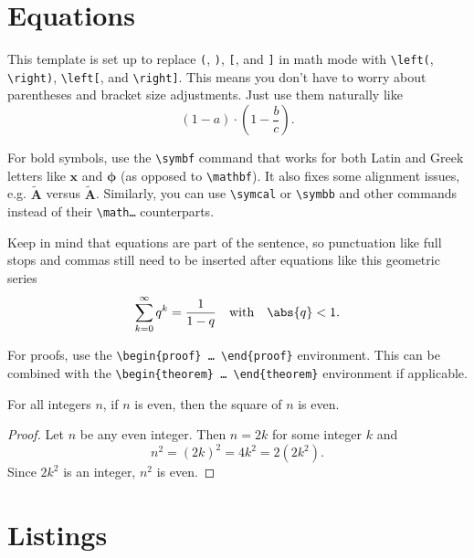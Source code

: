 \section{Equations}
\label{equations}

This template is set up to replace \texttt{(}, \texttt{)}, \texttt{[}, and \texttt{]} in math mode with \texttt{\textbackslash left(}, \texttt{\textbackslash right)}, \texttt{\textbackslash left[}, and \texttt{\textbackslash right]}. This means you don't have to worry about parentheses and bracket size adjustments. Just use them naturally like
\begin{equation}
  \label{eq:label}
  (1 - a) \cdot (1 - \frac{b}{c})
  \text{.}
\end{equation}

For bold symbols, use the \texttt{\textbackslash symbf} command that works for both Latin and Greek letters like $\symbf{x}$ and $\symbf{\phi}$ (as opposed to \texttt{\textbackslash mathbf}). It also fixes some alignment issues, e.g. $\tilde{\symbf{A}}$ versus $\tilde{\mathbf{A}}$. Similarly, you can use \texttt{\textbackslash symcal} or \texttt{\textbackslash symbb} and other commands instead of their \texttt{\textbackslash math\dots} counterparts.

Keep in mind that equations are part of the sentence, so punctuation like full stops and commas still need to be inserted after equations like this geometric series
\begin{equation}
  \label{eq:label2}
  \sum_{k=0}^\infty q^k = \frac{1}{1-q}
  \quad\text{with}\quad
  \abs{q} < 1
  \text{.}
\end{equation}

For proofs, use the \texttt{\textbackslash begin\{proof\} \dots\ \textbackslash end\{proof\}} environment. This can be combined with the \texttt{\textbackslash begin\{theorem\} \dots\ \textbackslash end\{theorem\}} environment if applicable.

\begin{theorem}
  For all integers $n$, if $n$ is even, then the square of $n$ is even.
\end{theorem}

\begin{proof}
  Let $n$ be any even integer. Then $n = 2k$ for some integer $k$ and
  $$n^2 = (2k)^2 = 4k^2 = 2(2k^2) \text{.}$$
  Since $2k^2$ is an integer, $n^2$ is even.
\end{proof}

\section{Listings}
\label{sec:listings}

